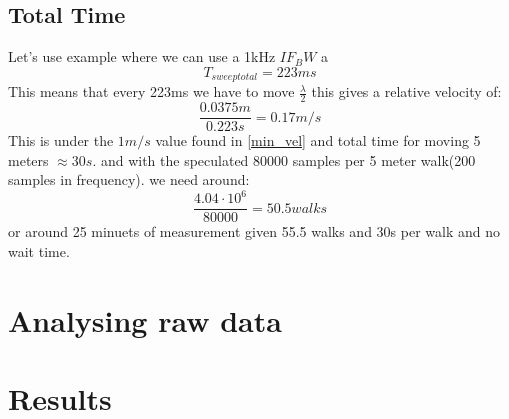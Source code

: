\subsection{Total Time}
Let's use example where we can use a 1kHz $IF_BW$ a
\begin{equation}
T_{sweep total} = 223ms
\end{equation}
This means that every 223ms we have to move $\frac{\lambda}{2}$ this gives a relative velocity of:
\begin{equation}
\frac{0.0375m}{0.223s} = 0.17 m/s
\end{equation}
This is under the $1m/s$ value found in \autoref{min_vel}
and total time for moving 5 meters $\approx 30s$.
and with the speculated 80000 samples per 5 meter walk(200 samples in frequency). we need around:
\begin{equation}
\frac{4.04 \cdot 10^6}{80000} = 50.5 walks
\end{equation}
or around 25 minuets of measurement given 55.5 walks and 30s per walk and no wait time.
\section{Analysing raw data}

\section{Results}